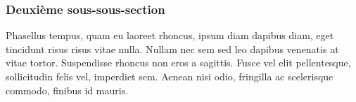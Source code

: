 \documentclass[11pt, a4paper, french]{article}
\begin{document}
\subsubsection{Deuxième sous-sous-section}
Phasellus tempus, quam eu laoreet rhoncus, ipsum diam dapibus diam, eget tincidunt risus risus vitae nulla. Nullam nec sem sed leo dapibus venenatis at vitae tortor. Suspendisse rhoncus non eros a sagittis. Fusce vel elit pellentesque, sollicitudin felis vel, imperdiet sem. Aenean nisi odio, fringilla ac scelerisque commodo, finibus id mauris.
\end{document}
